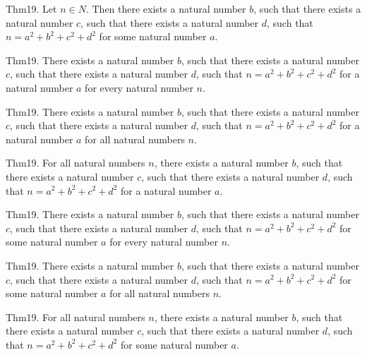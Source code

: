 \documentclass{article}
\begin{document}
Thm19. Let $n \in N$. Then there exists a natural number $b$, such that there exists a natural number $c$, such that there exists a natural number $d$, such that $n = a ^{ 2}+ b ^{ 2}+ c ^{ 2}+ d ^{ 2}$ for some natural number $a$.

Thm19. There exists a natural number $b$, such that there exists a natural number $c$, such that there exists a natural number $d$, such that $n = a ^{ 2}+ b ^{ 2}+ c ^{ 2}+ d ^{ 2}$ for a natural number $a$ for every natural number $n$.

Thm19. There exists a natural number $b$, such that there exists a natural number $c$, such that there exists a natural number $d$, such that $n = a ^{ 2}+ b ^{ 2}+ c ^{ 2}+ d ^{ 2}$ for a natural number $a$ for all natural numbers $n$.

Thm19. For all natural numbers $n$, there exists a natural number $b$, such that there exists a natural number $c$, such that there exists a natural number $d$, such that $n = a ^{ 2}+ b ^{ 2}+ c ^{ 2}+ d ^{ 2}$ for a natural number $a$.

Thm19. There exists a natural number $b$, such that there exists a natural number $c$, such that there exists a natural number $d$, such that $n = a ^{ 2}+ b ^{ 2}+ c ^{ 2}+ d ^{ 2}$ for some natural number $a$ for every natural number $n$.

Thm19. There exists a natural number $b$, such that there exists a natural number $c$, such that there exists a natural number $d$, such that $n = a ^{ 2}+ b ^{ 2}+ c ^{ 2}+ d ^{ 2}$ for some natural number $a$ for all natural numbers $n$.

Thm19. For all natural numbers $n$, there exists a natural number $b$, such that there exists a natural number $c$, such that there exists a natural number $d$, such that $n = a ^{ 2}+ b ^{ 2}+ c ^{ 2}+ d ^{ 2}$ for some natural number $a$.
\end{document}
